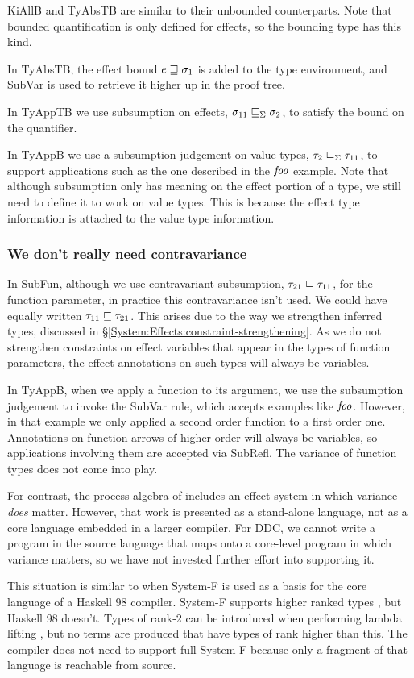 \clearpage{}

KiAllB and TyAbsTB are similar to their unbounded counterparts. Note that bounded quantification is only defined for effects, so the bounding type has this kind.

In TyAbsTB, the effect bound $e \sqsupseteq \sigma_1$ is added to the type environment, and SubVar is used to retrieve it higher up in the proof tree.

In TyAppTB we use subsumption on effects, $\sigma_{11} \sqsubseteq_{\Sigma} \sigma_2$, to satisfy the bound on the quantifier. 

In TyAppB we use a subsumption judgement on value types, $\tau_2 \sqsubseteq_{\Sigma} \tau_{11}$, to support applications such as the one described in the $\operatorname{\mathit{foo}}$ example. Note that although subsumption only has meaning on the effect portion of a type, we still need to define it to work on value types. This is because the effect type information is attached to the value type information. 

\subsubsection{We don't really need contravariance}

In SubFun, although we use contravariant subsumption, $\tau_{21} \sqsubseteq \tau_{11}$, for the function parameter, in practice this contravariance isn't used. We could have equally written $\tau_{11} \sqsubseteq \tau_{21}$. This arises due to the way we strengthen inferred types, discussed in \S\ref{System:Effects:constraint-strengthening}. As we do not strengthen constraints on effect variables that appear in the types of function parameters, the effect annotations on such types will always be variables. 

In TyAppB, when we apply a function to its argument, we use the subsumption judgement to invoke the SubVar rule, which accepts examples like $\operatorname{\mathit{foo}}$. However, in that example we only applied a second order function to a first order one. Annotations on function arrows of higher order will always be variables, so applications involving them are accepted via SubRefl. The variance of function types does not come into play. 

For contrast, the process algebra of \cite{nielson:from-cml-to-its-process-algebra} includes an effect system in which variance \emph{does} matter. However, that work is presented as a stand-alone language, not as a core language embedded in a larger compiler. For DDC, we cannot write a program in the source language that maps onto a core-level program in which variance matters, so we have not invested further effort into supporting it.

This situation is similar to when System-F is used as a basis for the core language of a Haskell 98 compiler. System-F supports higher ranked types \cite{peyton-jones:arbitrary-rank}, but Haskell 98 doesn't. Types of rank-2 can be introduced when performing lambda lifting \cite{peyton-jones:implementation}, but no terms are produced that have types of rank higher than this. The compiler does not need to support full System-F because only a fragment of that language is reachable from source.


